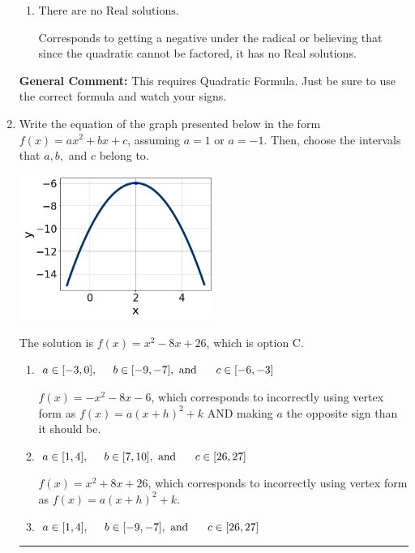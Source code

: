 \documentclass{extbook}[14pt]
\newcommand{\litem}[1]{\item #1

\rule{\textwidth}{0.4pt}}
\begin{document}
\begin{enumerate}
{\begin{enumerate}[label=\Alph*.]
 $x_1 = -1.129 \text{ and } x_2 = 0.295$, which corresponds to writing the Quadratic Formula as $\frac{b \pm \sqrt{b^2 - 4ac}}{2a}$
\item \( \text{There are no Real solutions.} \)

Corresponds to getting a negative under the radical or believing that since the quadratic cannot be factored, it has no Real solutions.
\end{enumerate}

\textbf{General Comment:} This requires Quadratic Formula. Just be sure to use the correct formula and watch your signs.
}
\litem{
Write the equation of the graph presented below in the form $f(x)=ax^2+bx+c$, assuming  $a=1$ or $a=-1$. Then, choose the intervals that $a, b,$ and $c$ belong to.

\begin{center}
    \includegraphics[width=0.5\textwidth]{../Figures/quadraticGraphToEquationA.png}
\end{center}




The solution is \( f(x) = x^{2} -8 x + 26 \), which is option C.\begin{enumerate}[label=\Alph*.]
\item \( a \in [-3, 0], \hspace*{5mm} b \in [-9, -7], \text{ and } \hspace*{5mm} c \in [-6, -3] \)

$f(x)=-x^{2} -8 x -6$, which corresponds to incorrectly using vertex form as $f(x) = a(x+h)^2+k$ AND making $a$ the opposite sign than it should be.
\item \( a \in [1, 4], \hspace*{5mm} b \in [7, 10], \text{ and } \hspace*{5mm} c \in [26, 27] \)

$f(x)=x^{2} +8 x + 26$, which corresponds to incorrectly using vertex form as $f(x) = a(x+h)^2+k$.
\item \( a \in [1, 4], \hspace*{5mm} b \in [-9, -7], \text{ and } \hspace*{5mm} c \in [26, 27] \)


\end{enumerate}}
\end{enumerate}
\end{document}
